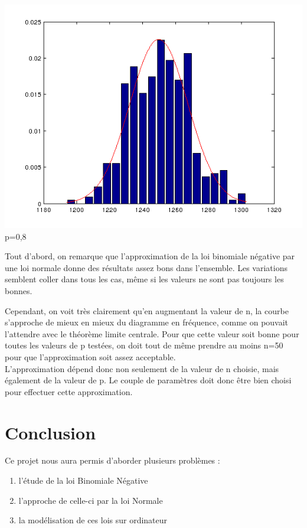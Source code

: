 \documentclass{article}
\begin{document}
\begin{center}
	\includegraphics[scale=0.5]{graph/n1000p8.png} \\
	p=0,8
\end{center}

Tout d'abord, on remarque que l'approximation de la loi binomiale négative par une loi normale donne des résultats assez bons dans l'ensemble. Les variations semblent coller dans tous les cas, même si les valeurs ne sont pas toujours les bonnes.

\bigskip
Cependant, on voit très clairement qu'en augmentant la valeur de n, la courbe s'approche de mieux en mieux du diagramme en fréquence, comme on pouvait l'attendre avec le théorème limite centrale. Pour que cette valeur soit bonne pour toutes les valeurs de p testées, on doit tout de même prendre au moins n=50 pour que l'approximation soit assez acceptable. \\
L'approximation dépend donc non seulement de la valeur de n choisie, mais également de la valeur de p. Le couple de paramètres doit donc être bien choisi pour effectuer cette approximation.

\newpage
\section*{Conclusion}
Ce projet nous aura permis d'aborder plusieurs problèmes :
\begin{enumerate}
	\item l'étude de la loi Binomiale Négative
	\item l'approche de celle-ci par la loi Normale
	\item la modélisation de ces lois sur ordinateur
\end{enumerate}
\end{document}
